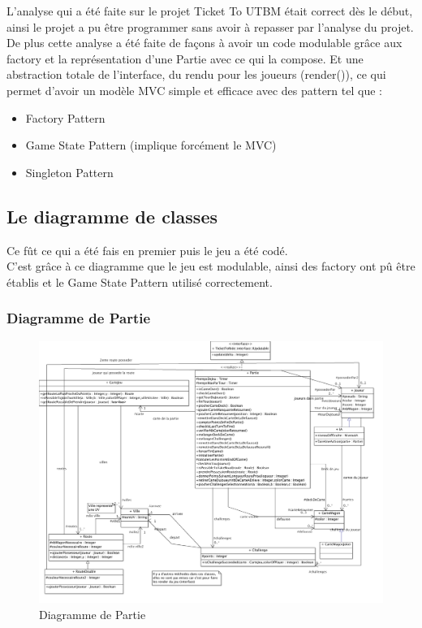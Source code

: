 \documentclass{report}
\begin{document}
L'analyse qui a été faite sur le projet Ticket To UTBM était correct dès le début, ainsi le projet a pu être programmer sans avoir à repasser par l'analyse du projet.\\
De plus cette analyse a été faite de façons à avoir un code modulable grâce aux factory et la représentation d'une Partie avec ce qui la compose. Et une abstraction totale de l'interface, du rendu pour les joueurs (render()), ce qui permet d'avoir un modèle MVC  simple et efficace avec des pattern tel que :
\begin{itemize}
\item Factory Pattern
\item Game State Pattern (implique forcément le MVC)
\item Singleton Pattern
\end{itemize}
\subsection{Le diagramme de classes}
Ce fût ce qui a été fais en premier puis le jeu a été codé.\\
C'est grâce à ce diagramme que le jeu est modulable, ainsi des factory ont pû être établis et le Game State Pattern utilisé correctement.
\subsubsection{Diagramme de Partie}
\begin{figure}[H]
\center
\includegraphics[angle=90,width=500pt]{diagPartie.png}
\caption{Diagramme de Partie}
\label{Diagramme de Partie}
\end{figure}
\end{document}

